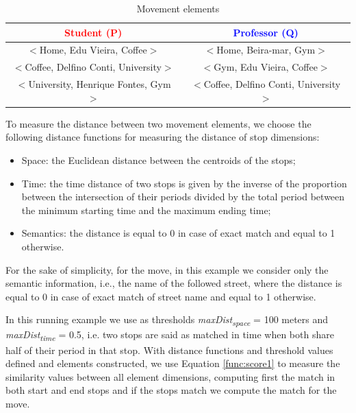\documentclass[12pt]{article}
\begin{document}
\begin{table}[h!]
\scriptsize
  \centering
  \begin{tabular}{|c|c|}
  	\hline
		\textcolor{Red}{\textbf{Student (P)}} & \textcolor{Blue}{\textbf{Professor (Q)}}\\
  	\hline
      $<$Home, Edu Vieira, Coffee$>$&$<$Home, Beira-mar, Gym$>$\\
      $<$Coffee, Delfino Conti, University$>$&$<$Gym, Edu Vieira, Coffee$>$\\
      $<$University, Henrique Fontes, Gym$>$&$<$Coffee, Delfino Conti, University$>$\\
  	\hline
  \end{tabular}
  \label{tab:wrong}
  \caption{Movement elements}
  \label{tab:SMSM_tuples}
\end{table}

To measure the distance between two movement elements, we choose the following distance functions for measuring the distance of stop dimensions:
\begin{itemize}
  \item Space: the Euclidean distance between the centroids of the stops;
  \item Time: the time distance of two stops is given by the inverse of the proportion between the intersection of their periods divided by the total period between the minimum starting time and the maximum ending time;
  \item Semantics: the distance is equal to 0 in case of exact match and equal to 1 otherwise.
\end{itemize}
For the sake of simplicity, for the move, in this example we consider only the semantic information, i.e., the name of the followed street, where the distance is equal to 0 in case of exact match of street name and equal to 1 otherwise.

In this running example we use as thresholds \textit{maxDist\textsubscript{space}} = 100 meters and \textit{maxDist\textsubscript{time}} = 0.5, i.e. two stops are said as matched in time when both share half of their period in that stop.
With distance functions and threshold values defined and elements constructed, we use Equation \ref{func:score1} to measure the similarity values between all element dimensions, computing first the match in both start and end stops and if the stops match we compute the match for the move. 
\end{document}
